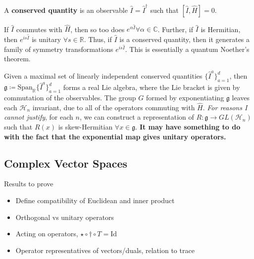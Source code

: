 \documentclass[11pt,fleqn]{article}
\begin{document}
\begin{definition}
	A \textbf{conserved quantity} is an observable $\hat{I} = \hat{I}^\dagger$ such that $[\hat{I},\hat{H}] = 0$.
\end{definition}
\begin{remark}
	If $\hat{I}$ commutes with $\hat{H}$, then so too does $e^{\alpha \hat{I}} \forall \alpha \in \mathbb{C}$. Further, if $\hat{I}$ is Hermitian, then $e^{i s \hat{I}}$ is unitary $\forall s \in \mathbb{R}$. Thus, if $\hat{I}$ is a conserved quantity, then it generates a family of symmetry transformations $e^{is\hat{I}}$. This is essentially a quantum Noether's theorem.
	
	Given a maximal set of linearly independent conserved quantities $\{\hat{I}^a\}_{a=1}^d$, then $\mathfrak{g} \coloneqq \text{Span}_\mathbb{R}\{\hat{I}^a\}_{a=1}^d$ forms a real Lie algebra, where the Lie bracket is given by commutation of the observables. The group $G$ formed by exponentiating $\mathfrak{g}$ leaves each $\mathcal{H}_n$ invariant, due to all of the operators commuting with $\hat{H}$. \textit{For reasons I cannot justify}, for each $n$, we can construct a representation of $R: \mathfrak{g} \to GL\left(\mathcal{H}_n\right)$ such that $R(x)$ is skew-Hermitian $\forall x \in \mathfrak{g}$. \textbf{It may have something to do with the fact that the exponential map gives unitary operators.}
\end{remark}

\begin{appendix}
	
\section{Complex Vector Spaces}
Results to prove
\begin{itemize}
	\item 	Define compatibility of Euclidean and inner product
	\item	Orthogonal vs unitary operators
	\item	Acting on operators, $ \star \circ \dagger \circ T = \text{Id} $
	\item	Operator representatives of vectors/duals, relation to trace
\end{itemize}

\end{appendix}
\end{document}
